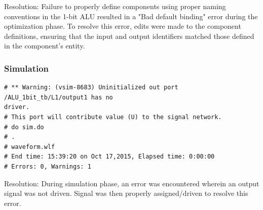 \documentclass[paper=letter, fontsize=11pt]{scrartcl}
\numberwithin{equation}{section} %
\numberwithin{figure}{section} %
\numberwithin{table}{section} %
\begin{document}
Resolution: Failure to properly define components using proper naming conventions in the 1-bit ALU resulted in a "Bad default binding" error during the optimization phase.
To resolve this error, edits were made to the component definitions, ensuring that the input and output identifiers matched those defined in the component's entity.\\[20pt]

\subsubsection{Simulation}
\begin{verbatim}
# ** Warning: (vsim-8683) Uninitialized out port /ALU_1bit_tb/L1/output1 has no 
driver.
# This port will contribute value (U) to the signal network.
# do sim.do
# .
# waveform.wlf
# End time: 15:39:20 on Oct 17,2015, Elapsed time: 0:00:00
# Errors: 0, Warnings: 1
\end{verbatim} 

Resolution: During simulation phase, an error was encountered wherein an output signal was not driven. Signal was then properly assigned/driven to resolve this error. \\[20pt] 
\end{document}
